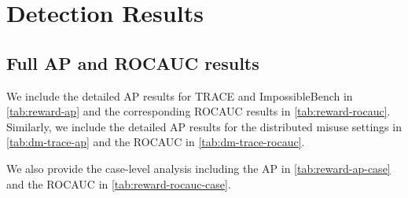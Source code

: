 \documentclass{article} %
\begin{document}
\section{Detection Results}
\label{app:full-results}

\subsection{Full AP and ROCAUC results}

We include the detailed AP results for TRACE and ImpossibleBench in \cref{tab:reward-ap} and the corresponding ROCAUC results in \cref{tab:reward-rocauc}. Similarly, we include the detailed AP results for the distributed misuse settings in \cref{tab:dm-trace-ap} and the ROCAUC in \cref{tab:dm-trace-rocauc}.

We also provide the case-level analysis including the AP in \cref{tab:reward-ap-case} and the ROCAUC in \cref{tab:reward-rocauc-case}.
\end{document}
